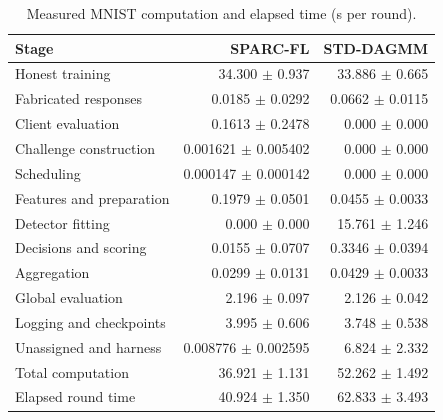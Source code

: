\begin{table}[t]\centering\footnotesize\setlength{\tabcolsep}{8pt}
\caption{Measured MNIST computation and elapsed time (s per round).}\label{tab:std-segments-mnist}
\begin{tabular}{lrr}\toprule Stage & SPARC-FL & STD-DAGMM \\ \midrule
Honest training & 34.300 $\pm$ 0.937 & 33.886 $\pm$ 0.665 \\
Fabricated responses & 0.0185 $\pm$ 0.0292 & 0.0662 $\pm$ 0.0115 \\
Client evaluation & 0.1613 $\pm$ 0.2478 & 0.000 $\pm$ 0.000 \\
Challenge construction & 0.001621 $\pm$ 0.005402 & 0.000 $\pm$ 0.000 \\
Scheduling & 0.000147 $\pm$ 0.000142 & 0.000 $\pm$ 0.000 \\
Features and preparation & 0.1979 $\pm$ 0.0501 & 0.0455 $\pm$ 0.0033 \\
Detector fitting & 0.000 $\pm$ 0.000 & 15.761 $\pm$ 1.246 \\
Decisions and scoring & 0.0155 $\pm$ 0.0707 & 0.3346 $\pm$ 0.0394 \\
Aggregation & 0.0299 $\pm$ 0.0131 & 0.0429 $\pm$ 0.0033 \\
Global evaluation & 2.196 $\pm$ 0.097 & 2.126 $\pm$ 0.042 \\
\midrule
Logging and checkpoints & 3.995 $\pm$ 0.606 & 3.748 $\pm$ 0.538 \\
Unassigned and harness & 0.008776 $\pm$ 0.002595 & 6.824 $\pm$ 2.332 \\
\midrule
Total computation & 36.921 $\pm$ 1.131 & 52.262 $\pm$ 1.492 \\
Elapsed round time & 40.924 $\pm$ 1.350 & 62.833 $\pm$ 3.493 \\
\bottomrule\end{tabular}\end{table}
